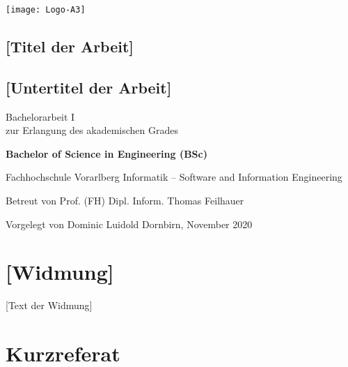 \documentclass[a4paper,12pt,twoside]{scrreprt}
\begin{document}
\cleardoublepage   %
\thispagestyle{empty}
\begin{titlepage}
  \begin{flushright}
  \texttt{[image: Logo-A3]}
  \end{flushright}
  \begin{flushleft}
  \section*{[Titel der Arbeit]}
  \subsection*{[Untertitel der Arbeit]}
  \vspace{1cm}
  
  Bachelorarbeit I\\
  zur Erlangung des akademischen Grades
  \vspace{0.5cm}
  
  \textbf{Bachelor of Science in Engineering (BSc)}

  \vspace{1cm}
  Fachhochschule Vorarlberg\newline
  Informatik – Software and Information Engineering

  \vspace{0.5cm}
  
  Betreut von\newline
  Prof. (FH) Dipl. Inform. Thomas Feilhauer
  
  \vspace{0.5cm}
  
  Vorgelegt von\newline
  Dominic Luidold\newline
  Dornbirn, November 2020
  \end{flushleft}
\end{titlepage}

\newpage
\section*{[Widmung]}

[Text der Widmung]

\newpage
\section*{Kurzreferat}
\end{document}
